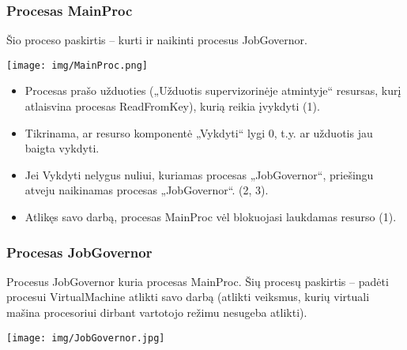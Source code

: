 \subsubsection{Procesas MainProc}
Šio proceso paskirtis – kurti ir naikinti procesus JobGovernor.

\texttt{[image: img/MainProc.png]}

	\begin{itemize}
		\item Procesas prašo užduoties („Užduotis supervizorinėje atmintyje“ resursas, kurį atlaisvina procesas ReadFromKey), kurią reikia įvykdyti (1).
		\item Tikrinama, ar resurso komponentė „Vykdyti“ lygi 0, t.y. ar užduotis jau baigta vykdyti.
		\item Jei Vykdyti nelygus nuliui, kuriamas procesas „JobGovernor“, priešingu atveju naikinamas procesas „JobGovernor“. (2, 3).
		\item Atlikęs savo darbą, procesas MainProc vėl blokuojasi laukdamas resurso (1).
	\end{itemize}
\subsubsection{Procesas JobGovernor}
Procesus JobGovernor kuria procesas MainProc. Šių procesų paskirtis – padėti procesui VirtualMachine atlikti savo darbą (atlikti veiksmus, kurių virtuali mašina procesoriui dirbant vartotojo režimu nesugeba atlikti).

\texttt{[image: img/JobGovernor.jpg]}

